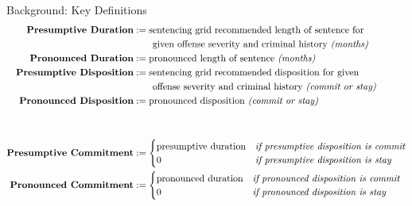 \documentclass[10pt]{beamer}
\begin{document}


{\footnotesize
\begin{frame}{Background: Key Definitions}
    \begin{align*}
        \textbf{Presumptive Duration} & := \text{sentencing grid recommended length of sentence for} \\
                              & \quad\quad \text{given offense severity and criminal history \textit{(months)}} \\
        \textbf{Pronounced Duration} & := \text{pronounced length of sentence \textit{(months)}} \\
        \textbf{Presumptive Disposition} & := \text{sentencing grid recommended disposition for given} \\
                              & \quad\quad \text{offense severity and criminal history \textit{(commit or stay)}} \\
        \textbf{Pronounced Disposition} & := \text{pronounced disposition \textit{(commit or stay)}} \\
        & \\
        & \\
        \textbf{Presumptive Commitment} & := \begin{cases} 
                                                  \text{presumptive duration} & \textit{if presumptive disposition is commit}  \\
                                                  0 & \textit{if presumptive disposition is stay}  \\
                                            \end{cases} \\
        \textbf{Pronounced Commitment} & := \begin{cases} 
                                                  \text{pronounced duration} & \textit{if pronounced disposition is commit}  \\
                                                  0 & \textit{if pronounced disposition is stay}  \\
                                            \end{cases} \\
    \end{align*}
\end{frame}
}
\end{document}
